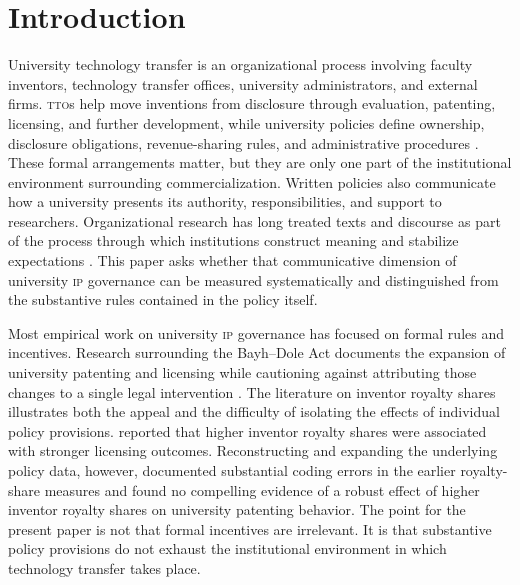\documentclass[12pt]{article}
\newcommand{\IP}{\textsc{ip}}
\newcommand{\TTO}{\textsc{tto}}
\begin{document}
\begin{abstract}
\vspace{7pt}
\noindent\textbf{Keywords:} policy communication; university technology transfer; intellectual property; governance; text as data; machine learning

\vspace{5pt}
\noindent\textbf{JEL Codes:} O34, O38, I23, C55, K11
\end{abstract}

\newpage
\setcounter{page}{1}

\section{Introduction}

University technology transfer is an organizational process involving faculty inventors, technology transfer offices, university administrators, and external firms. \TTO{}s help move inventions from disclosure through evaluation, patenting, licensing, and further development, while university policies define ownership, disclosure obligations, revenue-sharing rules, and administrative procedures \citep{Mowery2001,Jensen2003,Siegel2003}. These formal arrangements matter, but they are only one part of the institutional environment surrounding commercialization. Written policies also communicate how a university presents its authority, responsibilities, and support to researchers. Organizational research has long treated texts and discourse as part of the process through which institutions construct meaning and stabilize expectations \citep{Phillips2004,Putnam2009}. This paper asks whether that communicative dimension of university \IP{} governance can be measured systematically and distinguished from the substantive rules contained in the policy itself.

Most empirical work on university \IP{} governance has focused on formal rules and incentives. Research surrounding the Bayh--Dole Act documents the expansion of university patenting and licensing while cautioning against attributing those changes to a single legal intervention \citep{Mowery2001,Mowery2004,Sampat2006}. The literature on inventor royalty shares illustrates both the appeal and the difficulty of isolating the effects of individual policy provisions. \citet{Lach2008} reported that higher inventor royalty shares were associated with stronger licensing outcomes. Reconstructing and expanding the underlying policy data, however, \citet{OuelletteTutt2020} documented substantial coding errors in the earlier royalty-share measures and found no compelling evidence of a robust effect of higher inventor royalty shares on university patenting behavior. The point for the present paper is not that formal incentives are irrelevant. It is that substantive policy provisions do not exhaust the institutional environment in which technology transfer takes place.
\end{document}
